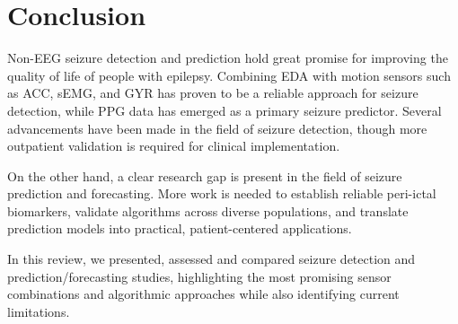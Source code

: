 \section{Conclusion}
Non-EEG seizure detection and prediction hold great promise for improving the quality of life of people with epilepsy. Combining EDA with motion sensors such as ACC, sEMG, and GYR has proven to be a reliable approach for seizure detection, while PPG data has emerged as a primary seizure predictor. Several advancements have been made in the field of seizure detection, though more outpatient validation is required for clinical implementation. 

On the other hand, a clear research gap is present in the field of seizure prediction and forecasting. More work is needed to establish reliable peri-ictal biomarkers, validate algorithms across diverse populations, and translate prediction models into practical, patient-centered applications. 

In this review, we presented, assessed and compared seizure detection and prediction/forecasting studies, highlighting the most promising sensor combinations and algorithmic approaches while also identifying current limitations. 
